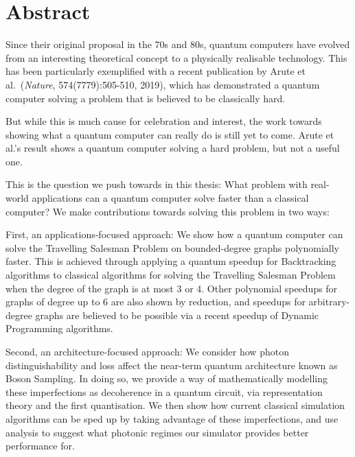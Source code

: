 \chapter*{Abstract}

Since their original proposal in the 70s and 80s, quantum computers have evolved from an interesting theoretical concept to a physically realisable technology. This has been particularly exemplified with a recent publication by Arute et al.~(\emph{Nature}, 574(7779):505-510, 2019), which has demonstrated a quantum computer solving a problem that is believed to be classically hard.

But while this is much cause for celebration and interest, the work towards showing what a quantum computer can really do is still yet to come. Arute et al.'s result shows a quantum computer solving a hard problem, but not a useful one.

This is the question we push towards in this thesis: What problem with real-world applications can a quantum computer solve faster than a classical computer? We make contributions towards solving this problem in two ways:

First, an applications-focused approach: We show how a quantum computer can solve the Travelling Salesman Problem on bounded-degree graphs polynomially faster. This is achieved through applying a quantum speedup for Backtracking algorithms to classical algorithms for solving the Travelling Salesman Problem when the degree of the graph is at most 3 or 4. Other polynomial speedups for graphs of degree up to 6 are also shown by reduction, and speedups for arbitrary-degree graphs are believed to be possible via a recent speedup of Dynamic Programming algorithms.

Second, an architecture-focused approach: We consider how photon distinguishability and loss affect the near-term quantum architecture known as Boson Sampling. In doing so, we provide a way of mathematically modelling these imperfections as decoherence in a quantum circuit, via representation theory and the first quantisation. We then show how current classical simulation algorithms can be sped up by taking advantage of these imperfections, and use analysis to suggest what photonic regimes our simulator provides better performance for.
